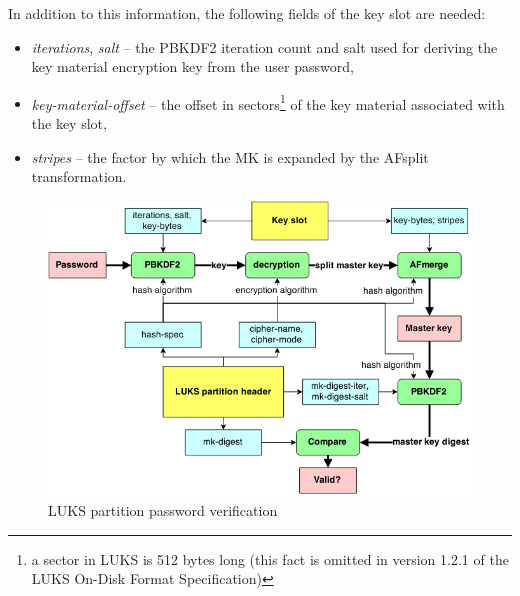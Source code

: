 \documentclass[12pt,oneside]{fithesis2}
\begin{document}
      In addition to this information, the following fields of the key slot are needed:
      \begin{itemize}
        \item \emph{iterations}, \emph{salt} -- the PBKDF2 iteration count and salt used for deriving the key material encryption key from the user password,
        \item \emph{key-material-offset} -- the offset in sectors\footnote{a sector in LUKS is 512 bytes long (this fact is omitted in version 1.2.1 of the LUKS On-Disk Format Specification)} of the key material associated with the key slot,
        \item \emph{stripes} -- the factor by which the MK is expanded by the AFsplit transformation.
      \end{itemize}
      
      \begin{figure}[t]
        \centering
        \includegraphics[width=\linewidth]{images/luks-pwcheck.png}
        \caption{LUKS partition password verification}
      \end{figure}
      
\end{document}
